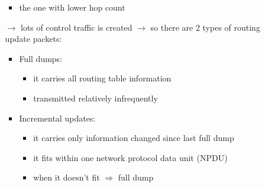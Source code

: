 \begin{itemize}
\begin{itemize}
\begin{itemize}
            \item the one with lower hop count
        \end{itemize}
        \item[$\rightarrow$] lots of control traffic is created $\rightarrow$ so there are 2 types of routing update
        packets:
        \begin{itemize}
            \item Full dumps:
            \begin{itemize}
                \item it carries all routing table information
                \item transmitted relatively infrequently
            \end{itemize}
            \item Incremental updates:
            \begin{itemize}
                \item it carries only information changed since last full dump
                \item it fits within one network protocol data unit (NPDU)
                \item when it doesn't fit $\Rightarrow$ full dump
            \end{itemize}
        \end{itemize}
    \end{itemize}
\end{itemize}

